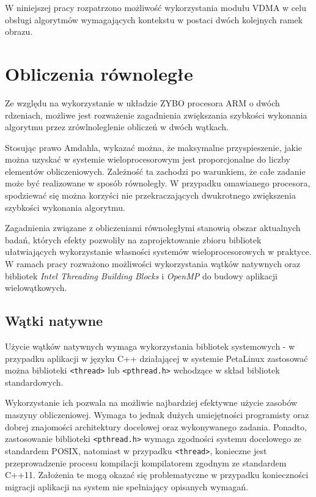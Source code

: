 W niniejszej pracy rozpatrzono możliwość wykorzystania modułu VDMA w celu obsługi algorytmów wymagających kontekstu w postaci dwóch kolejnych ramek obrazu.

\section{Obliczenia równoległe}
\label{sec:openmp}

Ze względu na wykorzystanie w układzie ZYBO procesora ARM o dwóch rdzeniach, możliwe jest rozważenie zagadnienia zwiększania szybkości wykonania algorytmu przez zrówlnoleglenie obliczeń w dwóch wątkach.

Stosując prawo Amdahla, wykazać można, że maksymalne przyspieszenie, jakie można uzyskać w systemie wieloprocesorowym jest proporcjonalne do liczby elementów obliczeniowych. Zależność ta zachodzi po warunkiem, że całe zadanie może być realizowane w sposób równoległy. W przypadku omawianego procesora, spodziewać się można korzyści nie przekraczających dwukrotnego zwiększenia szybkości wykonania algorytmu.

Zagadnienia związane z obliczeniami równoległymi stanowią obszar aktualnych badań, których efekty pozwoliły na zaprojektowanie zbioru bibliotek ułatwiających wykorzystanie własności systemów wieloprocesorowych w praktyce. W ramach pracy rozważono możliwości wykorzystania wątków natywnych oraz bibliotek \emph{Intel Threading Building Blocks} i \emph{OpenMP} do budowy aplikacji wielowątkowych.


\subsection{Wątki natywne}

Użycie wątków natywnych wymaga wykorzystania bibliotek systemowych - w przypadku aplikacji w języku C++ działającej w systemie PetaLinux zastosować można biblioteki \texttt{<thread>} lub \texttt{<pthread.h>} wchodzące w skład bibliotek standardowych. \cite{Williams2013}
 
Wykorzystanie ich pozwala na możliwie najbardziej efektywne użycie zasobów maszyny obliczeniowej. Wymaga to jednak dużych umiejętności programisty oraz dobrej znajomości architektury docelowej oraz wykonywanego zadania. Ponadto, zastosowanie biblioteki \texttt{<pthread.h>} wymaga zgodności systemu docelowego ze standardem POSIX, natomiast w przypadku \texttt{<thread>}, konieczne jest przeprowadzenie procesu kompilacji kompilatorem zgodnym ze standardem C++11. Założenia te mogą okazać się problematyczne w przypadku konieczności migracji aplikacji na system nie spełniający opisanych wymagań.


